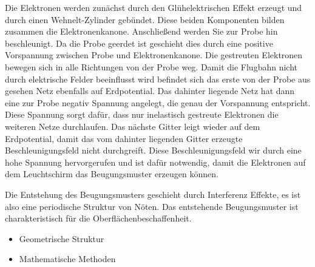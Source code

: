     Die Elektronen werden zunächst durch den Glühelektrischen Effekt erzeugt und durch einen Wehnelt-Zylinder gebündet.
    Diese beiden Komponenten bilden zusammen die Elektronenkanone.
    Anschließend werden Sie zur Probe hin beschleunigt.
    Da die Probe geerdet ist geschieht dies durch eine positive Vorspannung zwischen Probe und Elektronenkanone.
    Die gestreuten Elektronen bewegen sich in alle Richtungen von der Probe weg.
    Damit die Flugbahn nicht durch elektrische Felder beeinflusst wird befindet sich das erste von der Probe aus gesehen Netz ebenfalls auf Erdpotential.
    Das dahinter liegende Netz hat dann eine zur Probe negativ Spannung angelegt, die genau der Vorspannung entspricht.
    Diese Spannung sorgt dafür, dass nur inelastisch gestreute Elektronen die weiteren Netze durchlaufen.
    Das nächste Gitter leigt wieder auf dem Erdpotential, damit das vom dahinter liegenden Gitter erzeugte Beschleunigungsfeld nicht durchgreift.
    Diese Beschleunigungsfeld wir durch eine hohe Spannung hervorgerufen und ist dafür notwendig, damit die Elektronen auf dem Leuchtschirm das Beugungsmuster erzeugen können.

    Die Entstehung des Beugungsmusters geschieht durch Interferenz Effekte, es ist also eine periodische Struktur von Nöten.
    Das entstehende Beugungsmuster ist charakteristisch für die Oberflächenbeschaffenheit.
        \begin{itemize}
            \item Geometrische Struktur
            \item Mathematische Methoden
        \end{itemize}

    
